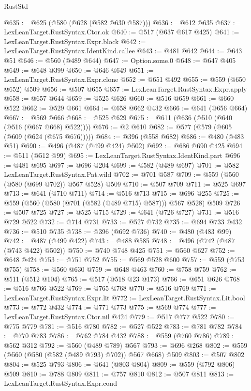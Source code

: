 \begin{lexlean}{RustStd}
\begin{coremodule}
@635 := @625 (@580 (@628 (@582 @630 @587)))
@636 := @612 @635
@637 := LexLeanTarget.RustSyntax.Ctor.ok
@640 := @517 (@637 @617 @425)
@641 := LexLeanTarget.RustSyntax.Expr.block
@642 := LexLeanTarget.RustSyntax.IdentKind.callee
@643 := @481 @642
@644 := @643 @51
@646 := @560 (@489 @644)
@647 := Option.some.{0}
@648 := @647 @405
@649 := @648 @399
@650 := @646 @649
@651 := LexLeanTarget.RustSyntax.Expr.clone
@652 := @651 @492
@655 := @559 (@650 @652) @509
@656 := @507 @655
@657 := LexLeanTarget.RustSyntax.Expr.apply
@658 := @657 @644
@659 := @525 @626
@660 := @516 @659
@661 := @660 @522
@662 := @529 @661
@664 := @658 @662 @432
@666 := @641 (@656 @664)
@667 := @569 @666
@668 := @525 @629
@675 := @611 (@636 (@510 (@640 (@516 (@667 @668) @522))))
@676 := @2 @610
@682 := @577 (@579 (@605 (@609 (@624 (@675 @676)))))
@684 := @396 (@558 @682)
@686 := @480 (@483 @51)
@690 := @496 (@487 (@499 @424) @502)
@692 := @686 @690 @425
@694 := @511 (@512 @99)
@695 := LexLeanTarget.RustSyntax.IdentKind.part
@696 := @481 @695
@697 := @696 @204
@699 := @582 (@489 @697)
@701 := @582 LexLeanTarget.RustSyntax.Pat.wild
@702 := @701 @587
@709 := @559 (@560 (@580 (@699 @702)) @567 @528) @509
@710 := @507 @709
@711 := @525 @697
@713 := @641 (@710 @711)
@714 := @516 @713
@715 := @696 @255
@725 := @559 (@560 (@580 (@701 (@582 (@489 @715) @587))) @567 @528) @509
@726 := @507 @725
@727 := @525 @715
@729 := @641 (@726 @727)
@731 := @516 @729 @522
@732 := @714 @731
@733 := @527 @732
@735 := @694 @733 @432
@736 := @510 @735
@738 := @396 (@692 @736)
@740 := @480 (@483 @99)
@742 := @487 (@499 @422)
@743 := @488 @585
@748 := @496 (@742 (@487 (@743 @422) @502))
@750 := @740 @748 @425
@751 := @560 @627
@752 := @648 @424
@753 := @751 @752
@755 := @569 @528 @600
@757 := @559 (@753 @755)
@758 := @560 @630
@759 := @648 @463
@760 := @758 @759
@762 := @511 (@512 @104)
@765 := @517 (@518 @23 @173)
@766 := @651 @626
@768 := @516 @766 @522
@769 := @765 @768
@770 := @516 @769
@771 := LexLeanTarget.RustSyntax.Expr.lit
@772 := LexLeanTarget.RustSyntax.Lit.bool
@773 := @772 @432
@774 := @771 @773
@775 := @569 @774
@777 := LexLeanTarget.RustSyntax.Ctor.nil @424
@779 := @517 @777 @522
@780 := @775 @779
@781 := @516 @780
@782 := @527 @522
@783 := @781 @782
@784 := @770 @783
@786 := @762 @784 @432
@788 := @559 (@760 @786)
@789 := @562 @312
@792 := @560 (@489 @789) @567
@793 := @696 @268
@802 := @559 (@560 (@580 (@582 (@489 @793) @702)) @567 @668) @509
@803 := @507 @802
@804 := @525 @793
@806 := @641 (@803 @804)
@809 := @559 (@792 @806) @509
@810 := @788 @809
@811 := @757 @810
@812 := @507 @811
@813 := LexLeanTarget.RustSyntax.Expr.cond

\end{coremodule}
\end{lexlean}
